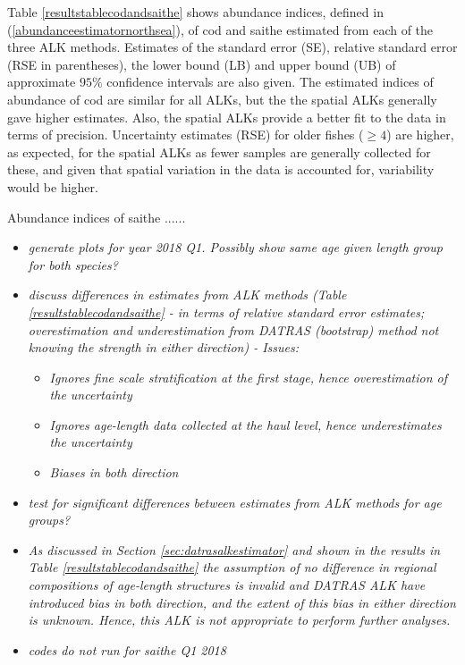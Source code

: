 \documentclass[a4paper 12pt]{article}
\numberwithin{equation}{section}
\begin{document}
Table \ref{resultstablecodandsaithe} shows abundance indices, defined in (\ref{abundanceestimatornorthsea}), of cod and saithe estimated from each of the three ALK methods. Estimates of the standard error (SE), relative standard error (RSE in parentheses), the lower bound (LB) and upper bound (UB) of approximate $95 \%$ confidence intervals are also given. The estimated indices of abundance of cod are similar for all ALKs, but the the spatial ALKs generally gave higher estimates. Also, the spatial ALKs provide a better fit to the data in terms of precision. Uncertainty estimates (RSE) for older fishes ($\ge 4$) are higher, as expected, for the spatial ALKs as fewer samples are generally collected for these, and given that spatial variation in the data is accounted for, variability would be higher.

Abundance indices of saithe ......


\begin{itemize}
\item \emph{generate plots for year 2018 Q1. Possibly show same age given length group for both species?}
\item \emph{discuss differences in estimates from ALK methods (Table \ref{resultstablecodandsaithe} - in terms of relative standard error estimates; overestimation and underestimation from DATRAS (bootstrap) method not knowing the strength in either direction) - Issues:}
\begin{itemize}
\item \emph{Ignores fine scale stratification at the first stage, hence overestimation of the uncertainty}
\item \emph{Ignores age-length data collected at the haul level, hence underestimates the uncertainty}
\item \emph{Biases in both direction}
\end{itemize}
\item \emph{test for significant differences between estimates from ALK methods for age groups?}
\item \emph{As discussed in Section \ref{sec:datrasalkestimator} and shown in the results in Table \ref{resultstablecodandsaithe} the assumption of no difference in regional compositions of age-length structures is invalid and DATRAS ALK have introduced bias in both direction, and the extent of this  bias in either direction is unknown. Hence, this ALK is not appropriate to perform further analyses. }
\item \emph{codes do not run for saithe Q1 2018}
\end{itemize}
\end{document}
